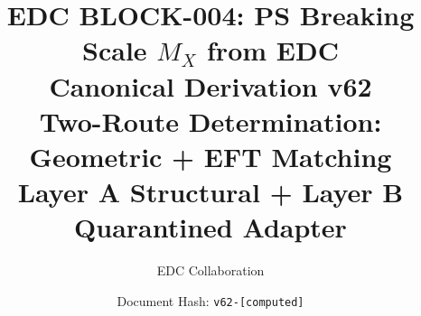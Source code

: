 \documentclass[11pt,a4paper]{article}
\theoremstyle{definition}
\begin{document}

\title{%
  \textbf{EDC BLOCK-004: PS Breaking Scale $M_X$ from EDC}\\[0.5em]
  \Large Canonical Derivation v62\\[0.3em]
  \large Two-Route Determination: Geometric + EFT Matching\\[0.3em]
  \normalsize Layer A Structural + Layer B Quarantined Adapter
}

\author{EDC Collaboration}
\date{Document Hash: \texttt{v62-[computed]}}

\maketitle

\end{document}
